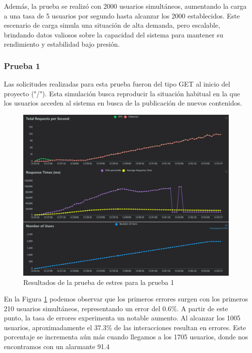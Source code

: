 \documentclass[10pt,times,twocolumn]{article}
\begin{document}
Además, la prueba se realizó con 2000 usuarios simultáneos, aumentando la carga a una tasa de 5 usuarios por segundo hasta alcanzar los 2000 establecidos. Este escenario de carga simula una situación de alta demanda, pero escalable, brindando datos valiosos sobre la capacidad del sistema para mantener su rendimiento y estabilidad bajo presión.

\subsubsection{Prueba 1}

Las solicitudes realizadas para esta prueba fueron del tipo GET al inicio del proyecto ("/"). Esta simulación busca reproducir la situación habitual en la que los usuarios acceden al sistema en busca de la publicación de nuevos contenidos.

\begin{figure}[H]
	\centering
	\includegraphics[width=\linewidth]{fig/prueba1_grafico1.jpeg}
	\caption{Resultados de la prueba de estres para la prueba 1}
	\label{fig:prueba1_grafico1}
\end{figure}

En la Figura \ref{fig:prueba1_grafico1} podemos observar que los primeros errores surgen con los primeros 210 usuarios simultáneos, representando un error del 0.6\%. A partir de este punto, la tasa de errores experimenta un notable aumento. Al alcanzar los 1005 usuarios, aproximadamente el 37.3\% de las interacciones resultan en errores. Este porcentaje se incrementa aún más cuando llegamos a los 1705 usuarios, donde nos encontramos con un alarmante 91.4%
\end{document}
